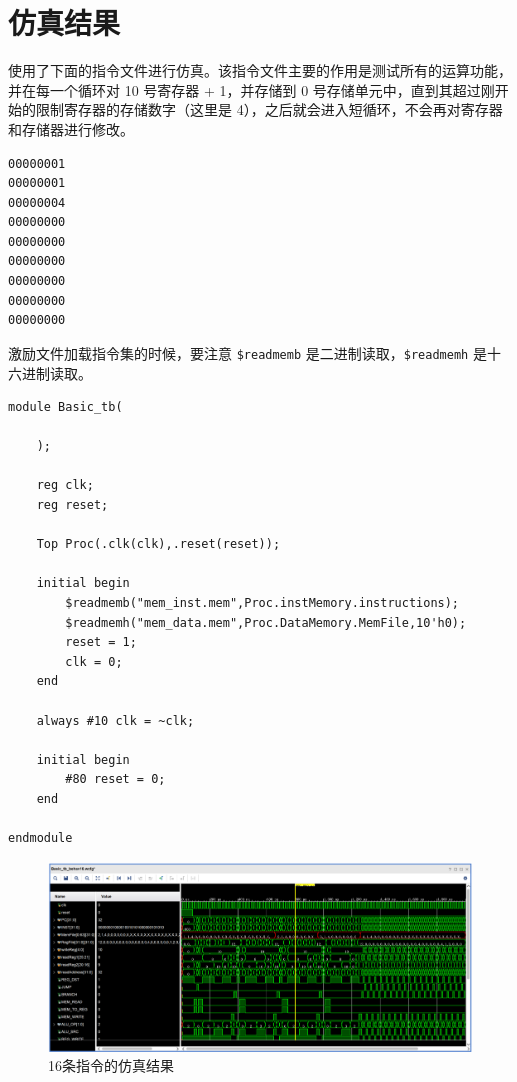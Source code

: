 \documentclass[a4paper,UTF8]{ctexart}
\providecommand{\code}[2]{}
\begin{document}
\begin{multicols}{2}
    \code{Top.v}{verilog}
\end{multicols}



\section{仿真结果}

使用了下面的指令文件进行仿真。该指令文件主要的作用是测试所有的运算功能，并在每一个循环对 10 号寄存器 + 1，并存储到 0 号存储单元中，直到其超过刚开始的限制寄存器的存储数字（这里是 4），之后就会进入短循环，不会再对寄存器和存储器进行修改。

    \code{simple.asm}{}
    \begin{lstlisting}[caption=mem\_data.mem]
00000001
00000001
00000004
00000000
00000000
00000000
00000000
00000000
00000000
    \end{lstlisting}

激励文件加载指令集的时候，要注意 \verb"$readmemb" 是二进制读取，\verb"$readmemh" 是十六进制读取。

\begin{lstlisting}[caption=Basic\_tb.v]
module Basic_tb(

    );

    reg clk;
    reg reset;

    Top Proc(.clk(clk),.reset(reset));

    initial begin
        $readmemb("mem_inst.mem",Proc.instMemory.instructions);
        $readmemh("mem_data.mem",Proc.DataMemory.MemFile,10'h0);
        reset = 1;
        clk = 0;
    end

    always #10 clk = ~clk;

    initial begin
        #80 reset = 0;
    end

endmodule
\end{lstlisting}

\begin{figure}[H]
    \centering
    \includegraphics[width=\textwidth]{figure2.png}
    \caption{16条指令的仿真结果}
    \label{fig:16}
\end{figure}
\end{document}
